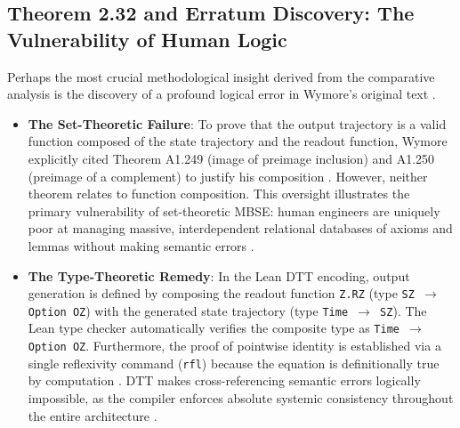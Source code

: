 \documentclass[11pt]{article}
\begin{document}
\subsection{Theorem 2.32 and Erratum Discovery: The Vulnerability of Human Logic}
Perhaps the most crucial methodological insight derived from the comparative analysis is the discovery of a profound logical error in Wymore's original text \parencite{Ref27}.\begin{itemize}
 \item \textbf{The Set-Theoretic Failure}: To prove that the output trajectory is a valid function composed of the state trajectory and the readout function, Wymore explicitly cited Theorem A1.249 (image of preimage inclusion) and A1.250 (preimage of a complement) to justify his composition \parencite{Ref27}. However, neither theorem relates to function composition. This oversight illustrates the primary vulnerability of set-theoretic MBSE: human engineers are uniquely poor at managing massive, interdependent relational databases of axioms and lemmas without making semantic errors \parencite{Ref27}.\item \textbf{The Type-Theoretic Remedy}: In the Lean DTT encoding, output generation is defined by composing the readout function \texttt{Z.RZ} (type \texttt{SZ $\to$ Option OZ}) with the generated state trajectory (type \texttt{Time $\to$ SZ}). The Lean type checker automatically verifies the composite type as \texttt{Time $\to$ Option OZ}. Furthermore, the proof of pointwise identity is established via a single reflexivity command (\texttt{rfl}) because the equation is definitionally true by computation \parencite{Ref19, Ref27, Ref25}. DTT makes cross-referencing semantic errors logically impossible, as the compiler enforces absolute systemic consistency throughout the entire architecture \parencite{Ref39, Ref40}.\end{itemize}
\end{document}
